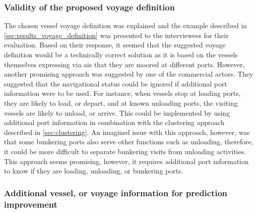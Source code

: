 \subsubsection{Validity of the proposed voyage definition}

The chosen vessel voyage definition was explained and the example described in \cref{sec:results_voyage_definition} was presented to the interviewees for their evaluation. Based on their response, it seemed that the suggested voyage definition would be a technically correct solution as it is based on the vessels themselves expressing via \acrshort{ais} that they are moored at different ports. However, another promising approach was suggested by one of the commercial actors. They suggested that the navigational status could be ignored if additional port information were to be used. For instance, when vessels stop at loading ports, they are likely to load, or depart, and at known unloading ports, the visiting vessels are likely to unload, or arrive. This could be implemented by using additional port information in combination with the clustering approach described in \cref{sec:clustering}. An imagined issue with this approach, however, was that some bunkering ports also serve other functions such as unloading, therefore, it could be more difficult to separate bunkering visits from unloading activities. This approach seems promising, however, it requires additional port information to know if they are loading, unloading, or bunkering ports.


\subsubsection{Additional vessel, or voyage information for prediction improvement}

